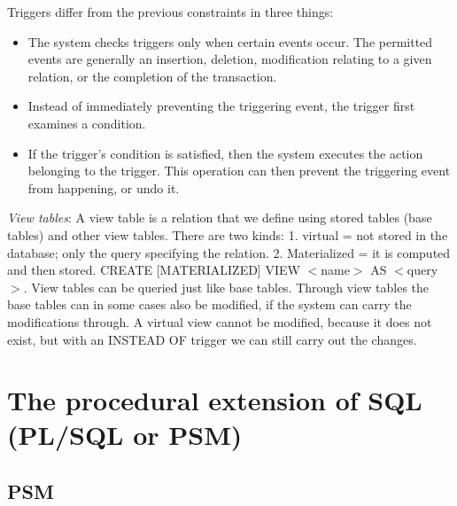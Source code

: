 \documentclass[margin=0px]{article}
\begin{document}
Triggers differ from the previous constraints in three things:
\begin{itemize}
    \item The system checks triggers only when certain events occur. The permitted events are generally an insertion, deletion, modification relating to a given relation, or the completion of the transaction.
    \item Instead of immediately preventing the triggering event, the trigger first examines a condition.
    \item If the trigger's condition is satisfied, then the system executes the action belonging to the trigger. This operation can then prevent the triggering event from happening, or undo it.
\end{itemize}
\textit{View tables}: A view table is a relation that we define using stored tables (base tables) and other view tables. There are two kinds: 1. virtual = not stored in the database; only the query specifying the relation. 2. Materialized = it is computed and then stored.
CREATE [MATERIALIZED] VIEW $<$name$>$ AS $<$query$>$. View tables can be queried just like base tables. Through view tables the base tables can in some cases also be modified, if the system can carry the modifications through. A virtual view cannot be modified, because it does not exist, but with an INSTEAD OF trigger we can still carry out the changes.

\section{The procedural extension of SQL (PL/SQL or PSM)}

\subsection{PSM}
\end{document}
